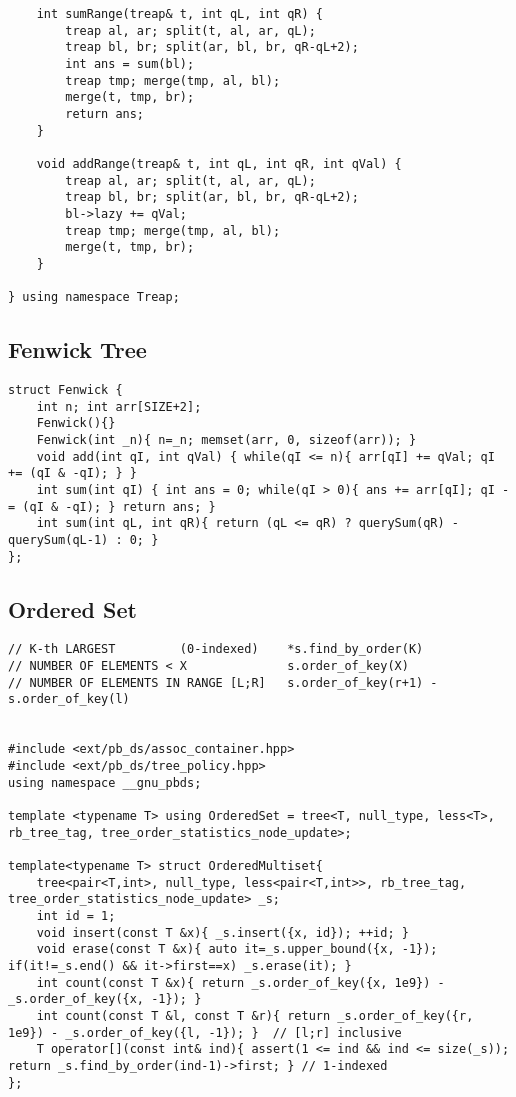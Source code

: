\documentclass[12pt,a4paper,onesided]{article}
\begin{document}
\begin{multicols}{3}
\begin{lstlisting}
    int sumRange(treap& t, int qL, int qR) {
        treap al, ar; split(t, al, ar, qL);
        treap bl, br; split(ar, bl, br, qR-qL+2);
        int ans = sum(bl);
        treap tmp; merge(tmp, al, bl);
        merge(t, tmp, br);
        return ans;
    }

    void addRange(treap& t, int qL, int qR, int qVal) {
        treap al, ar; split(t, al, ar, qL);
        treap bl, br; split(ar, bl, br, qR-qL+2);
        bl->lazy += qVal;
        treap tmp; merge(tmp, al, bl);
        merge(t, tmp, br);
    }

} using namespace Treap;
\end{lstlisting}


\subsection{Fenwick Tree}
\begin{lstlisting}
struct Fenwick {
	int n; int arr[SIZE+2];
	Fenwick(){}
	Fenwick(int _n){ n=_n; memset(arr, 0, sizeof(arr)); }
	void add(int qI, int qVal) { while(qI <= n){ arr[qI] += qVal; qI += (qI & -qI); } }
	int sum(int qI) { int ans = 0; while(qI > 0){ ans += arr[qI]; qI -= (qI & -qI); } return ans; }
	int sum(int qL, int qR){ return (qL <= qR) ? querySum(qR) - querySum(qL-1) : 0; }
};
\end{lstlisting}



\subsection{Ordered Set}
\begin{lstlisting}
// K-th LARGEST         (0-indexed)    *s.find_by_order(K) 
// NUMBER OF ELEMENTS < X              s.order_of_key(X)
// NUMBER OF ELEMENTS IN RANGE [L;R]   s.order_of_key(r+1) - s.order_of_key(l)


#include <ext/pb_ds/assoc_container.hpp>
#include <ext/pb_ds/tree_policy.hpp>
using namespace __gnu_pbds;

template <typename T> using OrderedSet = tree<T, null_type, less<T>, rb_tree_tag, tree_order_statistics_node_update>;

template<typename T> struct OrderedMultiset{
	tree<pair<T,int>, null_type, less<pair<T,int>>, rb_tree_tag, tree_order_statistics_node_update> _s;
	int id = 1;
	void insert(const T &x){ _s.insert({x, id}); ++id; }
	void erase(const T &x){ auto it=_s.upper_bound({x, -1}); if(it!=_s.end() && it->first==x) _s.erase(it); }
	int count(const T &x){ return _s.order_of_key({x, 1e9}) - _s.order_of_key({x, -1}); }
	int count(const T &l, const T &r){ return _s.order_of_key({r, 1e9}) - _s.order_of_key({l, -1}); }  // [l;r] inclusive
	T operator[](const int& ind){ assert(1 <= ind && ind <= size(_s)); return _s.find_by_order(ind-1)->first; } // 1-indexed
};
\end{lstlisting}




\end{multicols}
\end{document}
